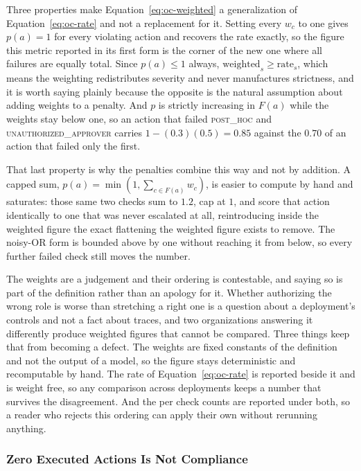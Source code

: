 \documentclass[11pt,a4paper]{article}
\begin{document}
Three properties make Equation~\ref{eq:oc-weighted} a generalization of
Equation~\ref{eq:oc-rate} and not a replacement for it. Setting every $w_c$ to one gives
$p(a) = 1$ for every violating action and recovers the rate exactly, so the figure this
metric reported in its first form is the corner of the new one where all failures are
equally total. Since $p(a) \leq 1$ always, $\mathrm{weighted}_s \geq \mathrm{rate}_s$,
which means the weighting redistributes severity and never manufactures strictness, and
it is worth saying plainly because the opposite is the natural assumption about adding
weights to a penalty. And $p$ is strictly increasing in $F(a)$ while the weights stay
below one, so an action that failed \textsc{post\_hoc} and
\textsc{unauthorized\_approver} carries $1 - (0.3)(0.5) = 0.85$ against the $0.70$ of an
action that failed only the first.

That last property is why the penalties combine this way and not by addition. A capped
sum, $p(a) = \min(1, \sum_{c \in F(a)} w_c)$, is easier to compute by hand and
saturates: those same two checks sum to $1.2$, cap at $1$, and score that action
identically to one that was never escalated at all, reintroducing inside the weighted
figure the exact flattening the weighted figure exists to remove. The noisy-OR form is
bounded above by one without reaching it from below, so every further failed check
still moves the number.

The weights are a judgement and their ordering is contestable, and saying so is part of
the definition rather than an apology for it. Whether authorizing the wrong role is
worse than stretching a right one is a question about a deployment's controls and not a
fact about traces, and two organizations answering it differently produce weighted
figures that cannot be compared. Three things keep that from becoming a defect. The
weights are fixed constants of the definition and not the output of a model, so the
figure stays deterministic and recomputable by hand. The rate of
Equation~\ref{eq:oc-rate} is reported beside it and is weight free, so any comparison
across deployments keeps a number that survives the disagreement. And the per check
counts are reported under both, so a reader who rejects this ordering can apply their
own without rerunning anything.

\subsubsection{Zero Executed Actions Is Not Compliance}
\end{document}

